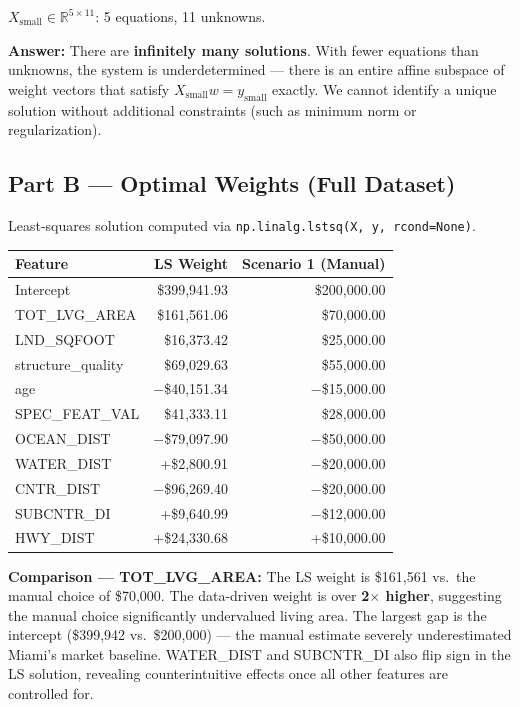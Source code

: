 \documentclass[11pt]{article}
\begin{document}
$X_{\text{small}} \in \mathbb{R}^{5 \times 11}$: 5 equations, 11 unknowns.

\textbf{Answer:} There are \textbf{infinitely many solutions}. With fewer equations than unknowns, the system is underdetermined --- there is an entire affine subspace of weight vectors that satisfy $X_{\text{small}} w = y_{\text{small}}$ exactly. We cannot identify a unique solution without additional constraints (such as minimum norm or regularization).

\subsection*{Part B --- Optimal Weights (Full Dataset)}

Least-squares solution computed via \texttt{np.linalg.lstsq(X, y, rcond=None)}.

\begin{center}
\begin{tabular}{l r r}
\toprule
Feature & LS Weight & Scenario 1 (Manual) \\
\midrule
Intercept        & \$399,941.93  & \$200,000.00 \\
TOT\_LVG\_AREA   & \$161,561.06  & \$70,000.00  \\
LND\_SQFOOT      & \$16,373.42   & \$25,000.00  \\
structure\_quality & \$69,029.63 & \$55,000.00  \\
age              & $-$\$40,151.34 & $-$\$15,000.00 \\
SPEC\_FEAT\_VAL  & \$41,333.11   & \$28,000.00  \\
OCEAN\_DIST      & $-$\$79,097.90 & $-$\$50,000.00 \\
WATER\_DIST      & +\$2,800.91   & $-$\$20,000.00 \\
CNTR\_DIST       & $-$\$96,269.40 & $-$\$20,000.00 \\
SUBCNTR\_DI      & +\$9,640.99   & $-$\$12,000.00 \\
HWY\_DIST        & +\$24,330.68  & +\$10,000.00  \\
\bottomrule
\end{tabular}
\end{center}

\textbf{Comparison --- TOT\_LVG\_AREA:} The LS weight is \$161,561 vs.\ the manual choice of \$70,000. The data-driven weight is over \textbf{2$\times$ higher}, suggesting the manual choice significantly undervalued living area. The largest gap is the intercept (\$399,942 vs.\ \$200,000) --- the manual estimate severely underestimated Miami's market baseline. WATER\_DIST and SUBCNTR\_DI also flip sign in the LS solution, revealing counterintuitive effects once all other features are controlled for.
\end{document}
